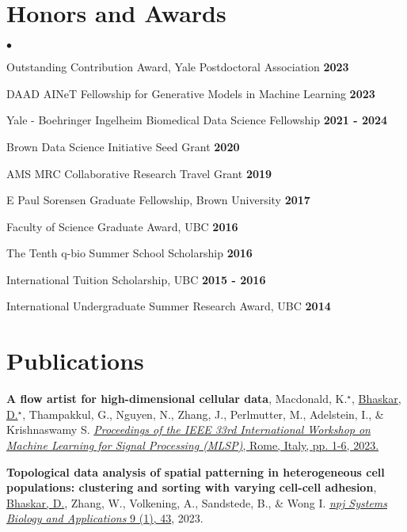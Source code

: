 \documentclass[margin,line]{res}
\newenvironment{list2}{
  \begin{list}{$\bullet$}{
      \setlength{\itemsep}{0in}
      \setlength{\parsep}{0in} \setlength{\parskip}{0in}
      \setlength{\topsep}{0in} \setlength{\partopsep}{0in}
      \setlength{\leftmargin}{0.2in}}}{\end{list}}
\begin{document}
\begin{resume}
\vspace*{.12cm}

\section{\sc Honors and Awards}
\begin{list2}
\setlength\itemsep{0.25em}
\item Outstanding Contribution Award, Yale Postdoctoral Association \hfill {\bf 2023}
\item DAAD AINeT Fellowship for Generative Models in Machine Learning \hfill {\bf 2023}
\item Yale - Boehringer Ingelheim Biomedical Data Science Fellowship \hfill {\bf 2021 - 2024}
\item Brown Data Science Initiative Seed Grant \hfill {\bf 2020}
\item AMS MRC Collaborative Research Travel Grant \hfill {\bf 2019}
\item E Paul Sorensen Graduate Fellowship, Brown University \hfill {\bf 2017}
\item Faculty of Science Graduate Award, UBC \hfill {\bf 2016}
\item The Tenth q-bio Summer School Scholarship \hfill {\bf 2016}
\item International Tuition Scholarship, UBC \hfill {\bf 2015 - 2016}
\item International Undergraduate Summer Research Award, UBC \hfill {\bf 2014}
\end{list2}

\section{\sc Publications}
{
\renewcommand\leftmargini{0em}
\begin{etaremune}[start=16]
\item{\bf A flow artist for high-dimensional cellular data},
Macdonald, K.$^\star$, \underline{Bhaskar, D.}$^\star$, Thampakkul, G., Nguyen, N., Zhang, J., Perlmutter, M., Adelstein, I., \& Krishnaswamy S.
\href{https://doi.org/10.1109/MLSP55844.2023.10285942}{\textit{Proceedings of the IEEE 33rd International Workshop on Machine Learning for Signal Processing (MLSP)}, Rome, Italy, pp. 1-6, 2023.}
\item{\bf Topological data analysis of spatial patterning in heterogeneous cell populations: clustering and sorting with varying cell-cell adhesion},
\underline{Bhaskar, D.}, Zhang, W., Volkening, A., Sandstede, B., \& Wong I.
\href{https://www.nature.com/articles/s41540-023-00302-8}{\textit{npj Systems Biology and Applications} 9 (1), 43}, 2023.
\end{etaremune}
} 


\end{resume}
\end{document}
